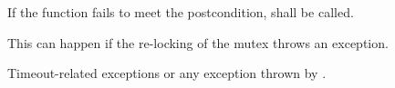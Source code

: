 {\begin{itemdescr}
 \pnum \remarks
        If the function fails to meet the postcondition, 
        shall be called.
        \begin{note} This can happen if the re-locking of the mutex throws an exception. \end{note}
 
 \pnum \throws Timeout-related
        exceptions or any exception thrown by .

\end{itemdescr}

}%

